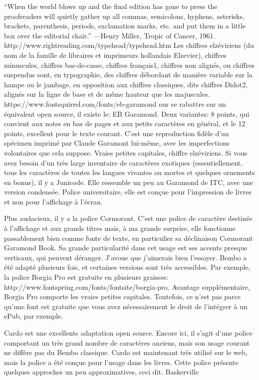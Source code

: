 \documentclass[12pt,a4paper,twocolumn]{book} %
\begin{document}
“When the world blows up and the final edition has gone to press the proofreaders will quietly gather up all commas, semicolons, hyphens, asterisks, brackets, parenthesis, periods, exclamation marks, etc. and put them in a little box over the editorial chair.”
—Henry Miller, Tropic of Cancer, 1961.
http://www.rightreading.com/typehead/typehead.htm
Les chiffres elzéviriens (du nom de la famille de libraires et imprimeurs hollandais Elzevier), chiffres minuscules, chiffres bas-de-casse, chiffres français1, chiffres non alignés, ou chiffres suspendus sont, en typographie, des chiffres débordant de manière variable sur la hampe ou le jambage, en opposition aux chiffres classiques, dits chiffres Didot2, alignés sur la ligne de base et de même hauteur que les majuscules. 
https://www.fontsquirrel.com/fonts/eb-garamond
our se rabattre sur un équivalent open source, il existe le: EB Garamond. Deux variantes: 8 points, qui convient aux notes en bas de pages et aux petits caractères en général, et le 12 points, excellent pour le texte courant. C’est une reproduction fidèle d’un spécimen imprimé par Claude Garamont lui-même, avec les imperfections volontaires que cela suppose. Vraies petites capitales, chiffre elzéviriens.
Si vous avez besoin d’un très large inventaire de caractères exotiques (essentiellement, tous les caractères de toutes les langues vivantes ou mortes et quelques ornements en bonus), il y a Junicode. Elle ressemble un peu au Garamond de ITC, avec une version condensée. Police universitaire, elle est conçue pour l’impression de livres et non pour l’affichage à l’écran.

Plus audacieux, il y a la police Cormorant. C’est une police de caractère destinée à l’affichage et aux grands titres mais, à ma grande surprise, elle fonctionne passablement bien comme fonte de texte, en particulier sa déclinaison Cormorant Garamond Book. Sa grande particularité dans cet usage est ses accents presque verticaux, qui peuvent déranger. J’avoue que j’aimerais bien l’essayer.
Bembo a été adapté plusieurs fois, et certaines versions sont très accessibles. Par exemple, la police Borgia Pro est gratuite en plusieurs graisses: http://www.fontspring.com/fonts/fontsite/borgia-pro. Avantage supplémentaire, Borgia Pro comporte les vraies petites capitales. Toutefois, ce n’est pas parce qu’une font est gratuite que vous avez nécessairement le droit de l’intégrer à un ePub, par exemple.

Cardo est une excellents adaptation open source. Encore ici, il s’agit d’une police comportant un très grand nombre de caractères anciens, mais son usage courant ne diffère pas du Bembo classique. Cardo est maintenant très utilisé sur le web, mais la police a été conçue pour l’usage dans les livres. Cette police présente quelques approches un peu approximatives, ceci dit.
Baskerville
\end{document}
